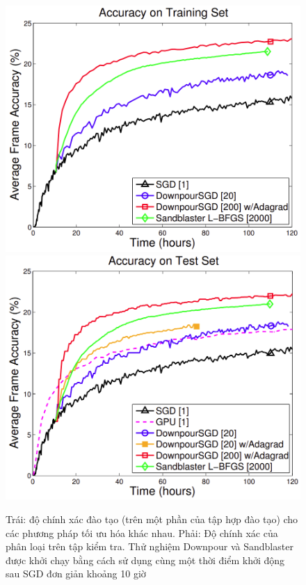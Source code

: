 \documentclass[11pt,a4paper]{article}
\numberwithin{equation}{subsection}
\numberwithin{figure}{subsection}
\numberwithin{table}{subsection}
\begin{document}
\begin{figure}[!h]
	\begin{center}
		\includegraphics[scale=0.37]{GG_2.PNG}
		\includegraphics[scale=0.39]{GG_3.PNG}
	\end{center}
	\caption{Trái: độ chính xác đào tạo (trên một phần của tập hợp đào tạo) cho các phương pháp tối ưu hóa khác nhau. Phải:  Độ chính xác của phân loại trên tập kiểm tra. Thử nghiệm Downpour và Sandblaster được khởi chạy bằng cách sử dụng cùng một thời điểm khởi động sau SGD đơn giản khoảng 10 giờ}
\end{figure}
\end{document}
